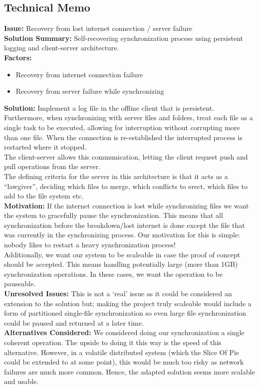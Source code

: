 \subsection{Technical Memo}
\textbf{Issue:} Recovery from lost internet connection / server failure\\
\textbf{Solution Summary:} Self-recovering synchronization process using persistent logging and client-server architecture.\\
\textbf{Factors:} 
\begin{itemize}
\item Recovery from internet connection failure
\item Recovery from server failure while synchronizing
\end{itemize}
\textbf{Solution:}
Implement a log file in the offline client that is persistent. Furthermore, when synchronizing with server files and folders, treat each file as a single task to be executed, allowing for interruption without corrupting more than one file. When the connection is re-established the interrupted process is restarted where it stopped.\\
The client-server allows this communication, letting the client request push and pull operations from the server.\\
The defining criteria for the server in this architecture is that it acts as a “lawgiver”, deciding which files to merge, which conflicts to erect, which files to add to the file system etc.\\
\newline
\textbf{Motivation:} If the internet connection is lost while synchronizing files we want the system to gracefully pause the synchronization. This means that all synchronization before the breakdown/lost internet is done except the file that was currently in the synchronizing process. Our motivation for this is simple: nobody likes to restart a heavy synchronization process!\\
Additionally, we want our system to be scaleable in case the proof of concept should be accepted. This means handling potentially large (more than 1GB) synchronization operations. In these cases, we want the operation to be pauseable.\\
\newline
\textbf{Unresolved Issues:}
This is not a ‘real’ issue as it could be considered an extension to the solution but; making the project truly scaleable would include a form of partitioned single-file synchronization so even large file synchronization could be paused and returned at a later time.\\
\newline
\textbf{Alternatives Considered:} We considered doing our synchronization a single coherent operation. The upside to doing it this way is the speed of this alternative. However, in a volatile distributed system (which the Slice Of Pie could be extended to at some point), this would be much too risky as network failures are much more common. Hence, the adapted solution seems more scalable and usable.
\newpage